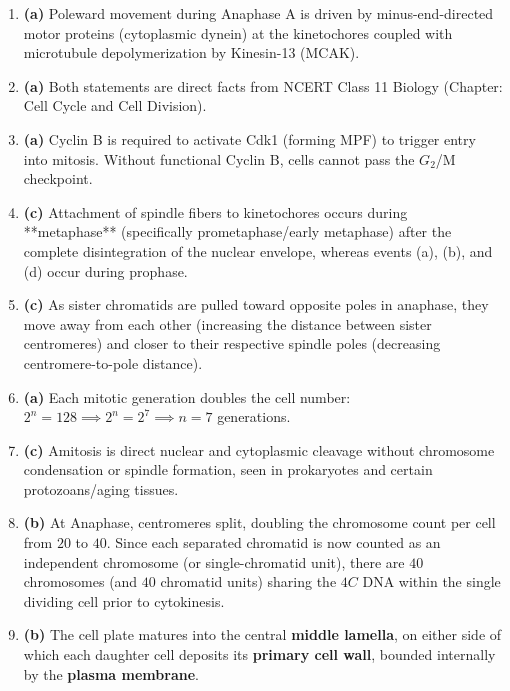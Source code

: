 \documentclass[11pt,a4paper]{article}
\begin{document}
\begin{enumerate}[label=\textbf{\arabic*.}, leftmargin=*]
\item \textbf{(a)} Poleward movement during Anaphase A is driven by minus-end-directed motor proteins (cytoplasmic dynein) at the kinetochores coupled with microtubule depolymerization by Kinesin-13 (MCAK).

\item \textbf{(a)} Both statements are direct facts from NCERT Class 11 Biology (Chapter: Cell Cycle and Cell Division).

\item \textbf{(a)} Cyclin B is required to activate Cdk1 (forming MPF) to trigger entry into mitosis. Without functional Cyclin B, cells cannot pass the $G_2$/M checkpoint.

\item \textbf{(c)} Attachment of spindle fibers to kinetochores occurs during **metaphase** (specifically prometaphase/early metaphase) after the complete disintegration of the nuclear envelope, whereas events (a), (b), and (d) occur during prophase.

\item \textbf{(c)} As sister chromatids are pulled toward opposite poles in anaphase, they move away from each other (increasing the distance between sister centromeres) and closer to their respective spindle poles (decreasing centromere-to-pole distance).

\item \textbf{(a)} Each mitotic generation doubles the cell number: $2^n = 128 \implies 2^n = 2^7 \implies n = 7$ generations.

\item \textbf{(c)} Amitosis is direct nuclear and cytoplasmic cleavage without chromosome condensation or spindle formation, seen in prokaryotes and certain protozoans/aging tissues.

\item \textbf{(b)} At Anaphase, centromeres split, doubling the chromosome count per cell from $20$ to $40$. Since each separated chromatid is now counted as an independent chromosome (or single-chromatid unit), there are $40$ chromosomes (and $40$ chromatid units) sharing the $4C$ DNA within the single dividing cell prior to cytokinesis.

\item \textbf{(b)} The cell plate matures into the central \textbf{middle lamella}, on either side of which each daughter cell deposits its \textbf{primary cell wall}, bounded internally by the \textbf{plasma membrane}.


\end{enumerate}
\end{document}
